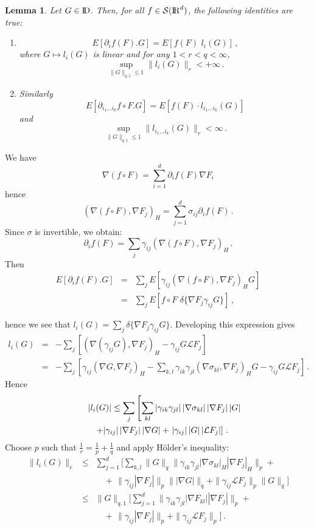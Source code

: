 \documentclass[12pt,a4paper]{book}
\newtheorem{lemma}[theorem]{Lemma}
\newcommand{\DD}{{\rm I\!D}}
\newcommand{\calS}{{\cal S}}
\newcommand{\R}{{\rm I\!R}}
\newcommand{\proof}{\noindent {\bf Proof:\ }}
\begin{document}
\begin{lemma}
\label{calcul-lemma}
Let $G\in \DD$. Then,  for all $f\in{\calS}(\R^d)$, the following
identities are true:
\begin{enumerate}
\item
$$
E[\partial_i f(F).G]=E[f(F)\,\,l_i(G)]\,,
$$
where $G\mapsto l_i(G)$ is linear and for any $1<r<q<\infty$,
$$
\sup_{\|G\|_{q,1}\leq1}\|l_i(G)\|_r<+\infty\,.
$$
\item  Similarly
$$
E[\partial_{i_1\ldots i_k}f\circ F.G]=E[f(F)\cdot l_{i_1\ldots
  i_k}(G)]
$$
and
$$
\sup_{\|G\|_{q,1}\leq1} \|l_{i_1\ldots i_k}(G)\|_r<\infty\,.
$$
\end{enumerate}
\end{lemma}
\proof
We have
$$
\nabla(f\circ F)=\sum_{i=1}^d\partial_i f(F)\nabla F_i
$$
hence
$$
(\nabla(f\circ F),\nabla F_j)_H=\sum_{j=1}^d\sigma_{ij}\partial_i f(F)\,.
$$
Since $\sigma$ is invertible, we obtain:
$$
\partial_i f(F)=\sum_j\gamma_{ij}(\nabla(f\circ F),\nabla F_j)_H\,.
$$
Then
\begin{eqnarray*}
E[\partial_i f(F).G] & = & \sum_j E\left[\gamma_{ij}
         (\nabla(f\circ F),\nabla F_j)_H G\right]  \\
& = & \sum_j E\left[f\circ F\,\,\delta\{\nabla F_j\gamma_{ij}G\}\right]\,,
\end{eqnarray*}

\noindent
hence we see that $l_i(G)=\sum_j\delta\{\nabla
F_j\gamma_{ij}G\}$. Developing this expression gives
\begin{eqnarray*}
l_i(G) & = & -\sum_j\left[(\nabla(\gamma_{ij}G),
           \nabla F_j)_H-\gamma_{ij}G{\mathcal L}F_j\right] \\
& = & -\sum_j\left[\gamma_{ij}(\nabla G,\nabla
  F_j)_H-\sum_{k,l}\gamma_{ik}\gamma_{jl}
(\nabla\sigma_{kl},\nabla F_j)_HG-\gamma_{ij}G{\mathcal L}F_j\right]\,.
\end{eqnarray*}
Hence
\begin{eqnarray*}
\lefteqn{|l_{i}(G)|\leq\sum_j\left[\sum_{kl}|\gamma_{ik}\gamma_{jl}|\,
|\nabla\sigma_{kl}|\,|\nabla F_j|\,|G|\right.}\\
 &&+     |\gamma_{ij}|\,|\nabla F_j|\,|\nabla G| + \left. \vphantom{\sigma_{kl}}|\gamma_{ij}|\,|G|\,|{\mathcal
    L}F_j|\right]\,.
\end{eqnarray*}
Choose $p$ such that  $\frac{1}{r}=\frac{1}{p}+\frac{1}{q}$ and apply
H\"older's inequality:
\begin{eqnarray*}
\|l_i(G)\|_r & \leq & \sum_{j=1}^d\Big[ \sum_{k,l}\|G\|_q
\|\gamma_{ik}\gamma_{jl}|\nabla\sigma_{kl}|_H|\nabla F_j|_H\|_p+ \\
& & \quad
+\,\|\gamma_{ij}|\nabla F_j|\|_p\||\nabla G|\|_q+\|\gamma_{ij}{\mathcal L}F_j\|_p
         \|G\|_q\Big] \\
& \leq & \|G\|_{q,1}\Big[\sum_{j=1}^d \|\gamma_{ik}\gamma_{jl}|\nabla F_{kl}|
          |\nabla F_j|\|_p+ \\
& & \quad
+\,\|\gamma_{ij}|\nabla F_j|\|_p+ \|\gamma_{ij}{\mathcal L}F_j\|_p\Big]\,.
\end{eqnarray*}
\end{document}
